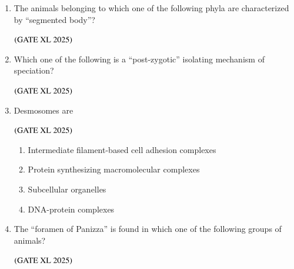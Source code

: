 \documentclass[journal]{IEEEtran}
\begin{document}
\begin{enumerate}
    \item The animals belonging to which one of the following phyla are characterized by ``segmented body''?

    \hfill $\left(\text{GATE XL 2025}\right)$
    \begin{enumerate}
    \end{enumerate}

    \item Which one of the following is a ``post-zygotic'' isolating mechanism of speciation?

    \hfill $\left(\text{GATE XL 2025}\right)$
    \begin{enumerate}
    \end{enumerate}

    \item Desmosomes are

    \hfill $\left(\text{GATE XL 2025}\right)$
    \begin{enumerate}
            \item Intermediate filament-based cell adhesion complexes
            \item Protein synthesizing macromolecular complexes
            \item Subcellular organelles
            \item DNA-protein complexes
    \end{enumerate}

    \item The ``foramen of Panizza'' is found in which one of the following groups of animals?

    \hfill $\left(\text{GATE XL 2025}\right)$
    \begin{enumerate}
    \end{enumerate}


\end{enumerate}
\end{document}
